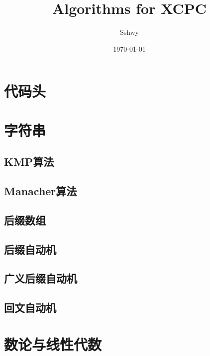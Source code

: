 \documentclass[a4paper,12pt]{article}
\begin{document}
\title{Algorithms for XCPC}
\author{Sshwy}
\date{\today}
\maketitle

\newpage

\tableofcontents
\newpage
{}

\section{代码头}



\section{字符串}

\subsection{KMP算法}

\subsection{Manacher算法}

\subsection{后缀数组}

\subsection{后缀自动机}

\subsection{广义后缀自动机}

\subsection{回文自动机}


\section{数论与线性代数}
\end{document}
